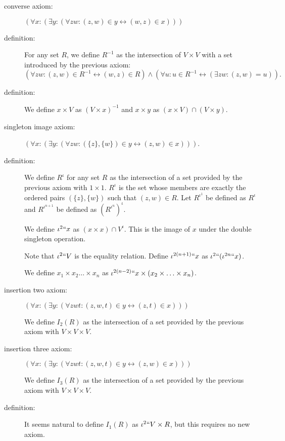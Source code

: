 \documentclass[112pt]{article}
\theoremstyle{definition}
\theoremstyle{remark}
\begin{document}
\begin{description}
\item[converse axiom:] $(\forall x:(\exists y:(\forall zw:(z,w)\in y \leftrightarrow (w,z) \in x)))$

\item[definition:]  For any set $R$, we define $R^{-1}$ as the intersection of $V \times V$ with a set introduced by the previous axiom:  $$(\forall zw:(z,w)\in R^{-1} \leftrightarrow (w,z) \in R) \wedge (\forall u:u \in R^{-1} \leftrightarrow (\exists zw:(z,w)=u)).$$

\item[definition:]  We define $x \times V$ as $(V \times x)^{-1}$ and $x \times y$ as $(x \times V) \cap (V \times y)$.


\item[singleton image axiom:]  $(\forall x:(\exists y:(\forall zw:(\{z\},\{w\}) \in y \leftrightarrow (z,w) \in x)))$.
\item[definition:]  We define $R^{\iota}$ for any set $R$ as the intersection of a set provided by the previous axiom with $1 \times 1$.  $R^{\iota}$ is the set whose members are exactly the ordered pairs $(\{z\},\{w\})$ such that $(z,w)\in R$.  Let $R^{\iota^1}$ be defined as $R^{\iota}$ and $R^{\iota^{n+1}}$ be defined as $(R^{\iota^n})^\iota$.

We define $\iota^2``x$ as $(x \times x) \cap V^\iota$.  This is the image of $x$ under the double singleton operation.

Note that $\iota^2``V$ is the equality relation.  Define $\iota^{2(n+1)}``x$ as $\iota^2``(\iota^{2n}``x)$.

We define $x_1 \times x_2 \ldots \times x_n$ as $\iota^{2(n-2)}``x \times (x_2 \times \ldots \times x_n)$.

\item[insertion two axiom:]  $(\forall x:(\exists y:(\forall zwt:(z,w,t) \in y \leftrightarrow (z,t) \in x)))$

We define $I_2(R)$ as the intersection of a set provided by the previous axiom with $V \times V \times V$.

\item[insertion three axiom:] $(\forall x:(\exists y:(\forall zwt:(z,w,t) \in y \leftrightarrow (z,w) \in x)))$

We define $I_3(R)$ as the intersection of a set provided by the previous axiom with $V \times V \times V$.

\item[definition:]  It seems natural to define $I_1(R)$ as $\iota^2``V \times R$, but this requires no new axiom.


\end{description}
\end{document}
